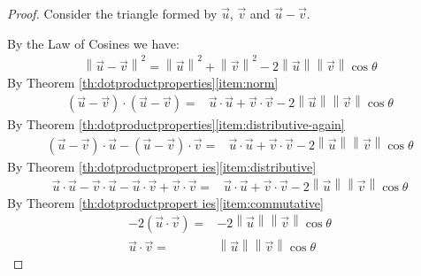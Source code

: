 \documentclass{ximera}
\newcommand\norm[1]{\left\lVert#1\right\rVert}
\begin{document}
\begin{proof} Consider the triangle formed by $\vec{u}$, $\vec{v}$ and $\vec{u}-\vec{v}$. 

\begin{image}[2in]
\end{image}

By the Law of Cosines we have:
\begin{align*}
\norm{\vec{u}-\vec{v}}^2=\norm{\vec{u}}^2+\norm{\vec{v}}^2-2\norm{\vec{u}}\norm{\vec{v}}\cos\theta
\end{align*}
By Theorem \ref{th:dotproductproperties}\ref{item:norm}
\begin{align*}
(\vec{u}-\vec{v})\cdot (\vec{u}-\vec{v})=&\vec{u}\cdot \vec{u}+\vec{v}\cdot \vec{v}-2\norm{\vec{u}}\norm{\vec{v}}\cos\theta
\end{align*}
By Theorem \ref{th:dotproductproperties}\ref{item:distributive-again}
\begin{align*}
(\vec{u}-\vec{v})\cdot \vec{u}-(\vec{u}-\vec{v})\cdot \vec{v}=&\vec{u}\cdot \vec{u}+\vec{v}\cdot \vec{v}-2\norm{\vec{u}}\norm{\vec{v}}\cos\theta
\end{align*}
By Theorem \ref{th:dotproductpropert ies}\ref{item:distributive}
\begin{align*}
\vec{u}\cdot \vec{u}-\vec{v}\cdot\vec{u}-\vec{u}\cdot\vec{v}+\vec{v}\cdot \vec{v}=&\vec{u}\cdot \vec{u}+\vec{v}\cdot \vec{v}-2\norm{\vec{u}}\norm{\vec{v}}\cos\theta
\end{align*}
By Theorem \ref{th:dotproductpropert ies}\ref{item:commutative}
\begin{align*}
-2(\vec{u}\cdot \vec{v})=&-2\norm{\vec{u}}\norm{\vec{v}}\cos\theta\\
\vec{u}\cdot \vec{v}=&\norm{\vec{u}}\norm{\vec{v}}\cos\theta
\end{align*}
\end{proof}
\end{document}
